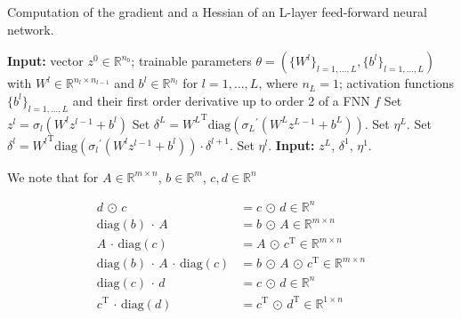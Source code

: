 \begin{algorithm}[H]
    \caption{Computation of the gradient and a Hessian of an L-layer feed-forward neural network.}
    \begin{algorithmic}[1]
        \State \textbf{Input:} vector $z^0 \in \mathbb{R}^{n_0}$; trainable parameters $\theta = (\{ W^l \}_{l = 1, \ldots, L}, \{ b^l \}_{l = 1, \ldots, L})$ with $W^l \in \mathbb{R}^{n_l \times n_{l-1}}$ and $b^l \in \mathbb{R}^{n_l}$ for $l = 1, \ldots, L$, where $n_L = 1$; activation functions $\{ b^l \}_{l = 1, \ldots, L}$ and their first order derivative up to order 2 of a FNN $f$
            \State Set $z^l = \sigma_l(W^l z^{l-1} + b^l)$
        \EndFor
        \State Set $\delta^{L} = {W^{L}}^{\mathrm{T}} \mathrm{diag}({\sigma_{L}}^{\prime}(W^{L} z^{L-1} + b^{L}))$.
        \State Set $\eta^{L}$.
            \State Set $\delta^{l} = {W^{l}}^{\mathrm{T}} \mathrm{diag}({\sigma_{l}}^{\prime}(W^{l} z^{l-1} + b^{l})) \cdot \delta^{l+1}$.
            \State Set $\eta^{l}$.
        \EndFor
        \State \textbf{Input:} $z^L$, $\delta^1$, $\eta^1$.
    \end{algorithmic}
\end{algorithm}




  






We note that for $A \in \mathbb{R}^{m \times n}$, $b \in \mathbb{R}^{m}$, $c, d \in \mathbb{R}^{n}$

\begin{align*}
    d \, \odot \, c &= c \, \odot \, d \in \mathbb{R}^{n} \\
    \mathrm{diag}(b) \, \cdot \, A &= b \, \odot \, A \in \mathbb{R}^{m \times n} \\
    A \, \cdot \, \mathrm{diag}(c) &= A \, \odot \, c^{\mathrm{T}} \in \mathbb{R}^{m \times n} \\
    \mathrm{diag}(b) \, \cdot \, A \, \cdot \, \mathrm{diag}(c) &= b \, \odot \, A \, \odot \, c^{\mathrm{T}} \in \mathbb{R}^{m \times n} \\
    \mathrm{diag}(c) \, \cdot \, d &= c \, \odot \, d \in \mathbb{R}^{n} \\
    c^{\mathrm{T}} \, \cdot \, \mathrm{diag}(d) &= c^{\mathrm{T}} \, \odot \, d^{\mathrm{T}} \in \mathbb{R}^{1 \times n} \\
\end{align*}







